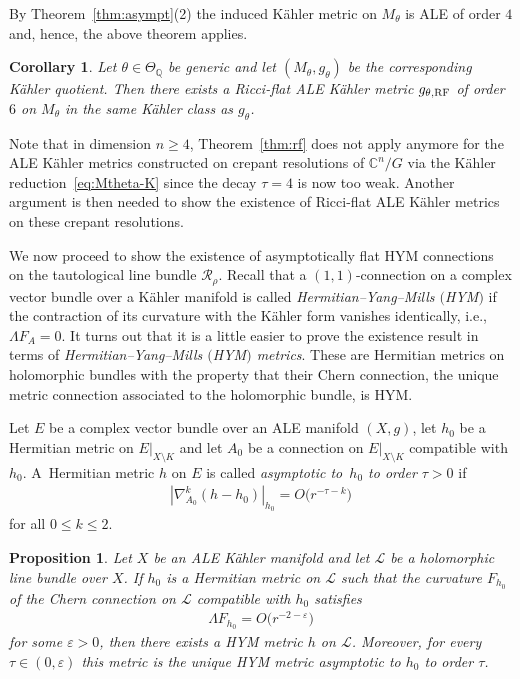 \documentclass[pdftex]{sigma}
\numberwithin{equation}{section}
\newcommand{\cL}{\mathcal{L}}
\newcommand{\sR}{\mathscr{R}}
\newcommand{\Q}{{\mathbb Q}}
\newcommand{\C}{{\mathbb C}}
\renewcommand{\epsilon}{\varepsilon}
\newcommand{\eps}{\epsilon}
\newcommand{\RF}{{\rm RF}}
\newtheorem{Corollary}[Theorem]{Corollary}
\newtheorem{Proposition}[Theorem]{Proposition}
 { \theoremstyle{definition}
\newtheorem{Definition}[Theorem]{Definition}
\newtheorem{Remark}[Theorem]{Remark} }
\begin{document}
By Theorem~\ref{thm:asympt}(2) the induced K\"ahler
metric on $M_\theta$ is ALE of order $4$ and, hence, the above theorem
applies.

\begin{Corollary}
  Let $\theta \in \Theta_{\Q}$ be generic and let
  $(M_{\theta},g_{\theta})$ be the corresponding K\"ahler quotient. Then
  there exists a Ricci-flat ALE K\"ahler metric $g_{\theta, \RF}$ of
  order $6$ on $M_\theta$ in the same K\"ahler class as $g_\theta$.
\end{Corollary}

\begin{Remark}
  Note that in dimension $n\geq 4$, Theorem~\ref{thm:rf} does not
  apply anymore for the ALE K\"ahler metrics constructed on crepant
  resolutions of $\C^n/G$ via the K\"ahler reduction~\eqref{eq:Mtheta-K}
  since the decay $\tau=4$ is now too weak. Another argument is then needed to show
  the existence of Ricci-f\/lat ALE K\"ahler metrics on these crepant
  resolutions.
\end{Remark}

We now proceed to show the existence of asymptotically f\/lat HYM
connections on the tautological line bundle $\sR_\rho$.  Recall that a
$(1,1)$-connection on a complex vector bundle over a K\"ahler manifold
is called {\em Hermitian--Yang--Mills $($HYM$)$} if the contraction of its
curvature with the K\"ahler form vanishes identically, i.e., $\Lambda F_A
=0$. It turns out that it is a little easier to prove the existence
result in terms of {\em Hermitian--Yang--Mills $($HYM$)$ metrics}. These
are Hermitian metrics on holomorphic bundles with the property that
their Chern connection, the unique metric connection associated to
the holomorphic bundle, is HYM.

\begin{Definition}\label{def:afm}
  Let $E$ be a complex vector bundle over an ALE manifold $(X,g)$, let
  $h_0$ be a Hermitian metric on $E|_{X{\setminus} K}$ and let $A_0$ be
  a connection on $E|_{X{\setminus} K}$ compatible with $h_0$.  A~Hermitian metric $h$ on $E$ is called \emph{asymptotic to~$h_0$ to
    order $\tau >0$} if
  \begin{gather*}
    |\nabla_{A_0}^k (h-h_0)|_{h_0} = O\big(r^{-\tau-k}\big)
  \end{gather*}
  for all $0 \leq k \leq 2$.
\end{Definition}

\begin{Proposition}\label{prop:hym}
  Let $X$ be an ALE K\"ahler manifold and let $\cL$ be a holomorphic
  line bundle over $X$.  If $h_0$ is a Hermitian metric on $\cL$ such
  that the curvature $F_{h_0}$ of the Chern connection on $\cL$
  compatible with $h_0$ satisfies
  \begin{gather*}
    \Lambda F_{h_0} = O\big(r^{-2-\eps}\big)
  \end{gather*}
  for some $\eps>0$, then there exists a HYM metric $h$ on $\cL$.
  Moreover, for every $\tau \in (0, \epsilon)$ this metric is the
  unique HYM metric asymptotic to $h_0$ to order $\tau$.
\end{Proposition}
\end{document}
